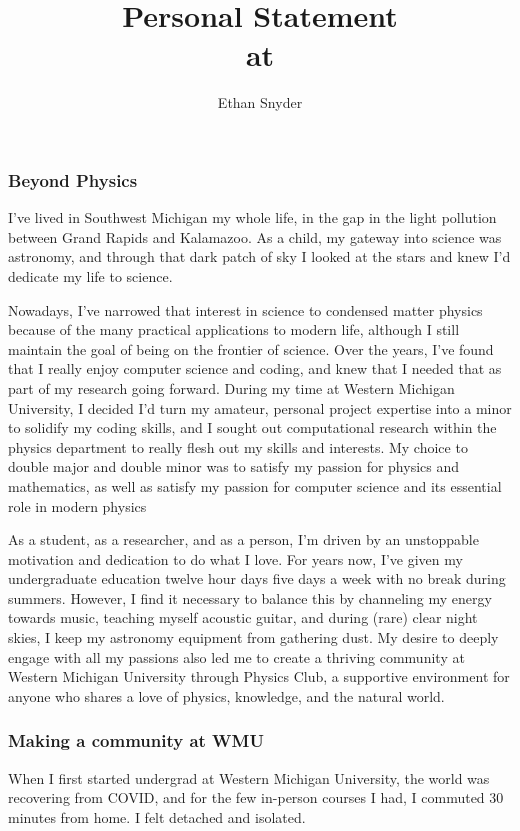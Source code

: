 \documentclass[11pt]{article}
\title{Personal Statement\\
	\large \dept{} at \school{}}
\author{Ethan Snyder}
\date{}
\begin{document}
\maketitle
\subsubsection*{Beyond Physics}
I've lived in Southwest Michigan my whole life, in the gap in the light pollution between Grand Rapids and Kalamazoo. As a child, my gateway into science was astronomy, and through that dark patch of sky I looked at the stars and knew I'd dedicate my life to science.

Nowadays, I've narrowed that interest in science to condensed matter physics because of the many practical applications to modern life, although I still maintain the goal of being on the frontier of science. Over the years, I've found that I really enjoy computer science and coding, and knew that I needed that as part of my research going forward. During my time at Western Michigan University, I decided I'd turn my amateur, personal project expertise into a minor to solidify my coding skills, and I sought out computational research within the physics department to really flesh out my skills and interests. My choice to double major and double minor was to satisfy my passion for physics and mathematics, as well as satisfy my passion for computer science and its essential role in modern physics

As a student, as a researcher, and as a person, I'm driven by an unstoppable motivation and dedication to do what I love. For years now, I've given my undergraduate education twelve hour days five days a week with no break during summers. However, I find it necessary to balance this by channeling my energy towards music, teaching myself acoustic guitar, and during (rare) clear night skies, I keep my astronomy equipment from gathering dust. My desire to deeply engage with all my passions also led me to create a thriving community at Western Michigan University through Physics Club, a supportive environment for anyone who shares a love of physics, knowledge, and the natural world.

\subsubsection*{Making a community at WMU}
When I first started undergrad at Western Michigan University, the world was recovering from COVID, and for the few in-person courses I had, I commuted 30 minutes from home. I felt detached and isolated.
\end{document}
